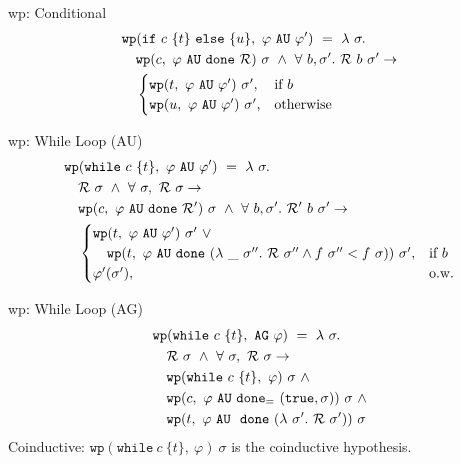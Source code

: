 \documentclass[aspectratio=169]{beamer}
\newcommand{\rust}[1]{\ensuremath{\mathtt{#1}}}
\newcommand{\rwhile}[2]{\ensuremath{\rust{while}~#1~\{#2\}}}
\newcommand{\rif}[3]{\ensuremath{\rust{if}~#1~\{#2\}~\rust{else}~\{#3\}}}
\newcommand{\wpx}[2]{\ensuremath{\mathtt{wp}(#1,~#2)}}
\begin{document}
\begin{frame}{wp: Conditional}
    \begin{align*}
    &\wpx{\rif{c}{t}{u}}{\AU{\varphi}{\varphi'}} ~=~ \lambda~\sigma. \\
    & \quad \wpx{c}{\AU{\varphi}{\done{\R}}}~\sigma ~\land~ \forall~b,\sigma'.~ \R~b~\sigma' \to \\
    & \quad \begin{cases}
      \wpx{t}{\AU{\varphi}{\varphi'}}~\sigma', &\text{if } b \\
      \wpx{u}{\AU{\varphi}{\varphi'}}~\sigma', &\text{otherwise}
    \end{cases}
    \end{align*}
\end{frame}

\begin{frame}{wp: While Loop (AU)}
    \begin{align*}
    &\wpx{\rwhile{c}{t}}{\AU{\varphi}{\varphi'}} ~=~ \lambda~\sigma. \\
    & \quad \R~\sigma ~\land~ \forall~\sigma,~\R~\sigma \to \\
    & \quad \wpx{c}{\AU{\varphi}{\done{\R'}}}~\sigma ~\land~ \forall~b,\sigma'.~ \R'~b~\sigma' \to \\
    & \quad \begin{cases}
      \wpx{t}{\AU{\varphi}{\varphi'}}~\sigma' ~\lor \\
      \quad \wpx{t}{\AU{\varphi}{\done{(\lambda~\_~\sigma''.~
          \R~\sigma'' \land f~\sigma'' < f~\sigma)}}}~\sigma', &\text{if } b \\
      \varphi'(\sigma'), &\text{o.w.}
    \end{cases}
    \end{align*}
\end{frame}

\begin{frame}{wp: While Loop (AG)}
    \begin{align*}
    &\wpx{\rwhile{c}{t}}{\AG{\varphi}} ~=~ \lambda~\sigma. \\
    & \quad \R~\sigma ~\land~ \forall~\sigma,~\R~\sigma \to \\
    & \quad \wpx{\rwhile{c}{t}}{\varphi}~\sigma ~\land \\
    & \quad \wpx{c}{\AU{\varphi}{\doneq{(\tm{true},\sigma)}{}}}~\sigma ~\land \\
    & \quad \wpx{t}{\varphi~\AU{}~\done{(\lambda~\sigma'.~ \R~\sigma')}}~\sigma
    \end{align*}
    Coinductive: $\wpx{\rwhile{c}{t}}{\varphi}~\sigma$ is the coinductive hypothesis.
\end{frame}
\end{document}
